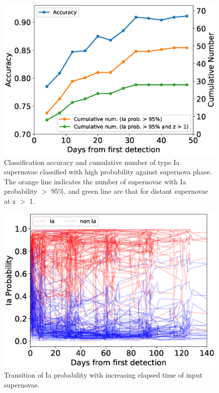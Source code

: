 \documentclass[useamsfonts]{pasj01}
\begin{document}
\begin{figure}[ht]
  \begin{center}
     \includegraphics[width=\columnwidth]{figures/n_observations_SNphase_v200206.eps}
  \end{center}
  \caption{%
  Classification accuracy and cumulative number of type Ia supernovae classified with high probability against supernova phase.
  The orange line indicates the number of supernovae with Ia probability $>$ 95\%, and green line are that for distant supernovae at z $>$ 1. %
  }%
  \label{fig:n_observations_SNphase}
\end{figure}
%
%
\begin{figure}[ht]
  \begin{center}
     \includegraphics[width=\columnwidth]{figures/n_observations_visualized_Ia_probability_200206.eps}
  \end{center}
  \caption{%
  Transition of Ia probability with increasing elapsed time of input supernovae.
  }%
  \label{fig:visualized_Ia_prob}
\end{figure}
\end{document}
